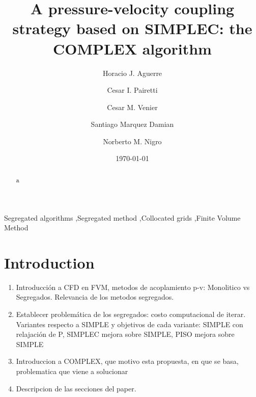 \documentclass[final,3p,times,10pt,onecolumn]{myElsarticle}
\date{\today}
\numberwithin{equation}{section}
\begin{document}
\begin{frontmatter}

\title{A pressure-velocity coupling strategy based on SIMPLEC: the COMPLEX algorithm}
 
\author[a,e]{Horacio J. Aguerre}
\author[b,a]{Cesar I. Pairetti}
\author[a,b]{Cesar M. Venier}
\author[a,c]{Santiago Marquez Damian}
\author[a,d]{Norberto M. Nigro}

\address[a]{Centro de Investigación de Métodos Computacionales, CONICET-UNL, Santa Fe, Argentina}
\address[b]{Escuela de Ingenier\'ia Mec\'anica, Facultad de Ciencias Exactas, Ingenieria y Agrimensura, Universidad Nacional de Rosario, Rosario, Argentina}
\address[c]{Facultad Regional Santa Fe, Universidad Tecnologica Nacional, Santa Fe, Argentina}
\address[d]{Facultad de Ingeniería y Ciencias Hídricas, Universidad Nacional del Litoral, Santa Fe, Argentina}
\address[e]{Facultad Regional Concepción de Uruguay, Universidad Tecnologica Nacional, Concepción del Uruguay, Argentina}

\begin{abstract}
a
\end{abstract}

\begin{keyword}
Segregated algorithms \sep Segregated method \sep Collocated grids \sep Finite Volume Method 
\end{keyword}
\end{frontmatter}

\section{Introduction}

\begin{enumerate}
    \item {\color{red} Introducción a CFD en FVM, metodos de acoplamiento p-v: Monolitico vs Segregados. Relevancia de los metodos segregados.} 
    \item {\color{red} Establecer problemática de los segregados: costo computacional de iterar. Variantes respecto a SIMPLE y objetivos de cada variante: SIMPLE con relajación de P, SIMPLEC mejora sobre SIMPLE, PISO mejora sobre SIMPLE}
    \item {\color{red} Introduccion a COMPLEX, que motivo esta propuesta, en que se basa, problematica que viene a solucionar}
    \item {\color{red} Descripcion de las secciones del paper.}
\end{enumerate}
\end{document}
